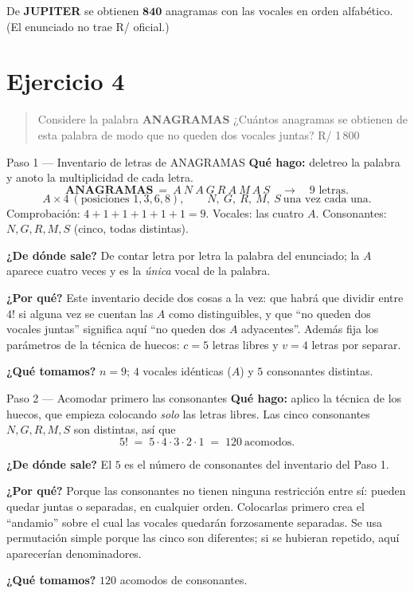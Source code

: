 \documentclass[11pt]{article}
\begin{document}
\begin{resp}
De \textbf{JUPITER} se obtienen $\mathbf{840}$ anagramas con las vocales en orden alfabético.
(El enunciado no trae R/ oficial.)
\end{resp}

\section*{Ejercicio 4}

\begin{quote}
Considere la palabra \textbf{ANAGRAMAS} ¿Cuántos anagramas se obtienen de esta palabra de modo que no queden
dos vocales juntas? \hfill R/ 1\,800
\end{quote}

\begin{paso}{Paso 1 --- Inventario de letras de ANAGRAMAS}
\textbf{Qué hago:} deletreo la palabra y anoto la multiplicidad de cada letra.
\[
\textbf{ANAGRAMAS}\ =\ A\ N\ A\ G\ R\ A\ M\ A\ S \quad\longrightarrow\quad 9 \text{ letras}.
\]
\[
A\times 4\ (\text{posiciones }1,3,6,8),\qquad N,\ G,\ R,\ M,\ S \ \text{una vez cada una}.
\]
Comprobación: $4+1+1+1+1+1=9$. \;Vocales: las cuatro $A$. \;Consonantes: $N,G,R,M,S$ (cinco, todas
distintas).

\textbf{¿De dónde sale?} De contar letra por letra la palabra del enunciado; la $A$ aparece cuatro veces y
es la \emph{única} vocal de la palabra.

\textbf{¿Por qué?} Este inventario decide dos cosas a la vez: que habrá que dividir entre $4!$ si alguna vez
se cuentan las $A$ como distinguibles, y que ``no queden dos vocales juntas'' significa aquí ``no queden dos
$A$ adyacentes''. Además fija los parámetros de la técnica de huecos: $c=5$ letras libres y $v=4$ letras por
separar.

\textbf{¿Qué tomamos?} $n=9$; $4$ vocales idénticas ($A$) y $5$ consonantes distintas.
\end{paso}

\begin{paso}{Paso 2 --- Acomodar primero las consonantes}
\textbf{Qué hago:} aplico la técnica de los huecos, que empieza colocando \emph{solo} las letras libres. Las
cinco consonantes $N,G,R,M,S$ son distintas, así que
\[
5! \;=\; 5\cdot4\cdot3\cdot2\cdot1 \;=\; 120 \ \text{acomodos}.
\]

\textbf{¿De dónde sale?} El $5$ es el número de consonantes del inventario del Paso 1.

\textbf{¿Por qué?} Porque las consonantes no tienen ninguna restricción entre sí: pueden quedar juntas o
separadas, en cualquier orden. Colocarlas primero crea el ``andamio'' sobre el cual las vocales quedarán
forzosamente separadas. Se usa permutación simple porque las cinco son diferentes; si se hubieran repetido,
aquí aparecerían denominadores.

\textbf{¿Qué tomamos?} $120$ acomodos de consonantes.
\end{paso}
\end{document}

